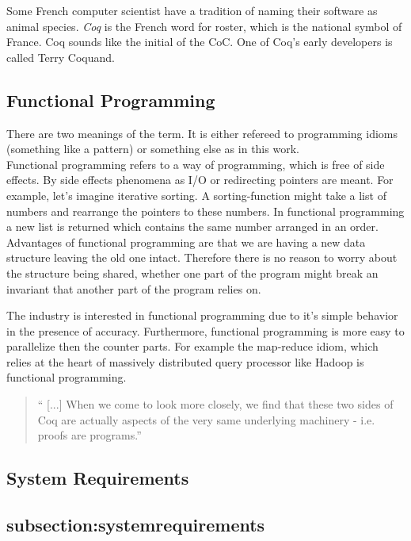 Some French computer scientist have a tradition of naming their software as animal species.
{\itshape Coq} is the French word for roster, which is the national symbol of France.
Coq sounds like the initial of the \gls{CoC}.
One of Coq's early developers is called Terry Coquand.


\subsection{Functional Programming}
\label{subsection:functionalProgramming}

There are two meanings of the term. 
It is either refereed to programming idioms (something like a pattern) or something else as in this work.\\

Functional programming refers to a way of programming, which is free of side effects.
By side effects phenomena as I/O or redirecting pointers are meant. 
For example, let's imagine iterative sorting. 
A sorting-function might take a list of numbers and rearrange the pointers to these numbers.
In functional programming a new list is returned which contains the same number arranged in an order.\\ 
Advantages of functional programming are that we are having a new data structure leaving the old one intact. 
Therefore there is no reason to worry about the structure being shared, whether one part of the program might break an invariant that another part of the program relies on.\par
The industry is interested in functional programming due to it's simple behavior in the presence of accuracy.
Furthermore, functional programming is more easy to parallelize then the counter parts.
For example the map-reduce idiom, which relies at the heart of massively distributed query processor like \gls{Hadoop} is functional programming. 

\begin{quote}
`` [...] When we come to look more closely, we find that these two sides of Coq are actually aspects of the very same underlying machinery - i.e. proofs are programs.'' 
\end{quote}




\subsection{System Requirements}
\subsection{subsection:systemrequirements}

